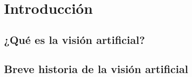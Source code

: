 \section{Introducción}
\subsection{¿Qué es la visión artificial?}


\subsection{Breve historia de la visión artificial}

\newpage
